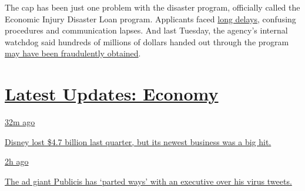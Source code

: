 The cap has been just one problem with the disaster program, officially
called the Economic Injury Disaster Loan program. Applicants faced
\href{https://www.nytimes.com/2020/04/09/business/smallbusiness/small-business-disaster-loans-coronavirus.html}{long
delays}, confusing procedures and communication lapses. And last
Tuesday, the agency's internal watchdog said hundreds of millions of
dollars handed out through the program
\href{https://www.nytimes.com/live/2020/07/28/business/stock-market-today-coronavirus\#thieves-are-targeting-small-business-relief-programs-a-watchdog-says}{may
have been fraudulently obtained}.

\hypertarget{latest-updates-economy}{%
\section{\texorpdfstring{\href{https://www.nytimes.com/live/2020/08/04/business/stock-market-today-coronavirus?action=click\&pgtype=Article\&state=default\&region=MAIN_CONTENT_1\&context=storylines_live_updates}{Latest
Updates:
Economy}}{Latest Updates: Economy}}\label{latest-updates-economy}}

\href{https://www.nytimes.com/live/2020/08/04/business/stock-market-today-coronavirus?action=click\&pgtype=Article\&state=default\&region=MAIN_CONTENT_1\&context=storylines_live_updates\#disney-lost-4-7-billion-last-quarter-but-its-newest-business-was-a-big-hit}{32m
ago}

\href{https://www.nytimes.com/live/2020/08/04/business/stock-market-today-coronavirus?action=click\&pgtype=Article\&state=default\&region=MAIN_CONTENT_1\&context=storylines_live_updates\#disney-lost-4-7-billion-last-quarter-but-its-newest-business-was-a-big-hit}{Disney
lost \$4.7 billion last quarter, but its newest business was a big hit.}

\href{https://www.nytimes.com/live/2020/08/04/business/stock-market-today-coronavirus?action=click\&pgtype=Article\&state=default\&region=MAIN_CONTENT_1\&context=storylines_live_updates\#the-ad-giant-publicis-has-parted-ways-with-an-executive-over-his-virus-tweets}{2h
ago}

\href{https://www.nytimes.com/live/2020/08/04/business/stock-market-today-coronavirus?action=click\&pgtype=Article\&state=default\&region=MAIN_CONTENT_1\&context=storylines_live_updates\#the-ad-giant-publicis-has-parted-ways-with-an-executive-over-his-virus-tweets}{The
ad giant Publicis has `parted ways' with an executive over his virus
tweets.}

